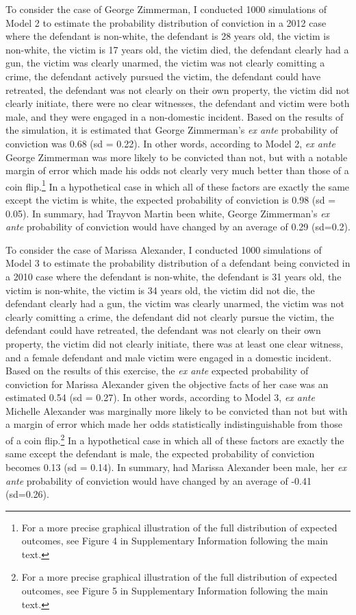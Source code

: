 \documentclass[12pt,article]{article}
\begin{document}
To consider the case of George Zimmerman, I conducted 1000 simulations
of Model 2 to estimate the probability distribution of conviction in a
2012 case where the defendant is non-white, the defendant is 28 years
old, the victim is non-white, the victim is 17 years old, the victim
died, the defendant clearly had a gun, the victim was clearly unarmed,
the victim was not clearly comitting a crime, the defendant actively
pursued the victim, the defendant could have retreated, the defendant
was not clearly on their own property, the victim did not clearly
initiate, there were no clear witnesses, the defendant and victim were
both male, and they were engaged in a non-domestic incident. Based on
the results of the simulation, it is estimated that George Zimmerman's
\emph{ex ante} probability of conviction was 0.68 (sd = 0.22). In other
words, according to Model 2, \emph{ex ante} George Zimmerman was more
likely to be convicted than not, but with a notable margin of error
which made his odds not clearly very much better than those of a coin
flip.\footnote{For a more precise graphical illustration of the full
  distribution of expected outcomes, see Figure 4 in Supplementary
  Information following the main text.} In a hypothetical case in which
all of these factors are exactly the same except the victim is white,
the expected probability of conviction is 0.98 (sd = 0.05). In summary,
had Trayvon Martin been white, George Zimmerman's \emph{ex ante}
probability of conviction would have changed by an average of 0.29
(sd=0.2).

To consider the case of Marissa Alexander, I conducted 1000 simulations
of Model 3 to estimate the probability distribution of a defendant being
convicted in a 2010 case where the defendant is non-white, the defendant
is 31 years old, the victim is non-white, the victim is 34 years old,
the victim did not die, the defendant clearly had a gun, the victim was
clearly unarmed, the victim was not clearly comitting a crime, the
defendant did not clearly pursue the victim, the defendant could have
retreated, the defendant was not clearly on their own property, the
victim did not clearly initiate, there was at least one clear witness,
and a female defendant and male victim were engaged in a domestic
incident. Based on the results of this exercise, the \emph{ex ante}
expected probability of conviction for Marissa Alexander given the
objective facts of her case was an estimated 0.54 (sd = 0.27). In other
words, according to Model 3, \emph{ex ante} Michelle Alexander was
marginally more likely to be convicted than not but with a margin of
error which made her odds statistically indistinguishable from those of
a coin flip.\footnote{For a more precise graphical illustration of the
  full distribution of expected outcomes, see Figure 5 in Supplementary
  Information following the main text.} In a hypothetical case in which
all of these factors are exactly the same except the defendant is male,
the expected probability of conviction becomes 0.13 (sd = 0.14). In
summary, had Marissa Alexander been male, her \emph{ex ante} probability
of conviction would have changed by an average of -0.41 (sd=0.26).
\end{document}

